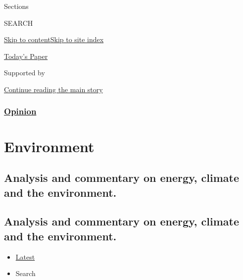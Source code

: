 Sections

SEARCH

\protect\hyperlink{site-content}{Skip to
content}\protect\hyperlink{site-index}{Skip to site index}

\href{https://myaccount.nytimes3xbfgragh.onion/auth/login?response_type=cookie\&client_id=vi}{}

\href{https://www.nytimes3xbfgragh.onion/section/todayspaper}{Today's
Paper}

Supported by

\protect\hyperlink{after-sponsor}{Continue reading the main story}

\hypertarget{opinion}{%
\subsubsection{\texorpdfstring{\href{/section/opinion}{Opinion}}{Opinion}}\label{opinion}}

\hypertarget{environment}{%
\section{Environment}\label{environment}}

\hypertarget{analysis-and-commentary-on-energy-climate-and-the-environment}{%
\subsection{Analysis and commentary on energy, climate and the
environment.}\label{analysis-and-commentary-on-energy-climate-and-the-environment}}

\hypertarget{analysis-and-commentary-on-energy-climate-and-the-environment-1}{%
\subsection{Analysis and commentary on energy, climate and the
environment.}\label{analysis-and-commentary-on-energy-climate-and-the-environment-1}}

\begin{itemize}
\tightlist
\item
  \protect\hyperlink{stream-panel}{Latest}
\item
  Search
\end{itemize}

